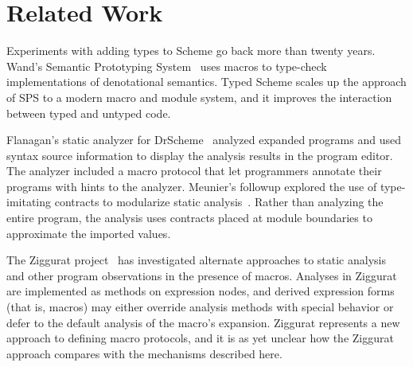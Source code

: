 \section{Related Work}
\label{sect:related}

Experiments with adding types to Scheme go back more than twenty
years. Wand's Semantic Prototyping System~\cite{wand84sps} uses macros
to type-check implementations of denotational semantics.
%
Typed Scheme scales up the approach of SPS to a modern macro and
module system, and it improves the interaction between typed and
untyped code.

Flanagan's static analyzer for DrScheme~\cite{ffkwf:mrspidey} analyzed
expanded programs and used syntax source information to display the
analysis results in the program editor. The analyzer included a macro
protocol that let programmers annotate their programs with hints to
the analyzer.
%
Meunier's followup explored the use of type-imitating contracts to
modularize static analysis~\cite{meunier06modular}. Rather than
analyzing the entire program, the analysis uses contracts placed at
module boundaries to approximate the imported values.

The Ziggurat project~\cite{fisher06ziggurat} has investigated
alternate approaches to static analysis and other program observations
in the presence of macros. Analyses in Ziggurat are implemented as
methods on expression nodes, and derived expression forms (that is,
macros) may either override analysis methods with special behavior or
defer to the default analysis of the macro's expansion. Ziggurat
represents a new approach to defining macro protocols, and it is as
yet unclear how the Ziggurat approach compares with the mechanisms
described here.
